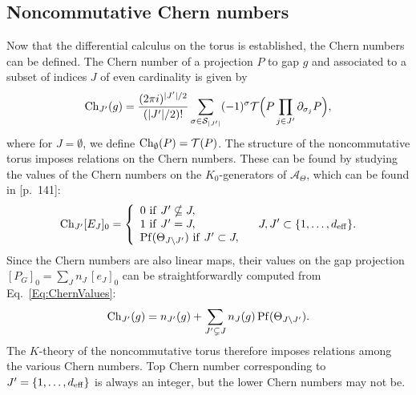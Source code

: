 \documentclass[
    aps,
    prb,
    twocolumn,
    floatfix,
    superscriptaddress,
	10pt
]{revtex4-2}
\begin{document}
\subsection{Noncommutative Chern numbers}

Now that the differential calculus on the torus is established, the Chern numbers can be defined.
The Chern number of a projection $P$ to gap $g$ and associated to a subset of indices $J$ of even cardinality is given by
\begin{equation}
	    {\rm Ch}_{J'}(g) = \frac{(2\pi i)^{|J'|/2}}{( |J'|/2 )!} \sum_{\sigma \in {\mathcal S}_{|J'|}} (-1)^\sigma {\mathcal T}\Big ( P \prod_{j \in J'} \partial_{\sigma_j}P \Big ) ,
\end{equation}
where for $J = \emptyset$, we define ${\rm Ch}_\emptyset(P) = {\mathcal T}(P)$.
The structure of the noncommutative torus imposes relations on the Chern numbers.
These can be found by studying the values of the Chern numbers on the $K_0$-generators of $\mathcal{A}_\Theta$, which can be found in \cite{Prodan2016}[p.~141]:
\begin{equation}\label{Eq:ChernValues}
{\rm Ch}_{J'} [E_J]_0 = \left \{ 
\begin{array}{l}
0 \ {\rm if} \ J'\nsubseteq J  , \\
1 \ {\rm if} \ J' = J , \\
{\rm Pf}(\Theta_{J\setminus J'}) \ {\rm if} \ J' \subset J,
\end{array}
\right .  \quad J, J' \subset \{1,\ldots,{d_\mathrm{eff}}\}.
\end{equation}
Since the Chern numbers are also linear maps, their values on the gap projection $[P_G]_0 = \sum_{J} n_J \, [e_J]_0$ can be straightforwardly computed from Eq.~\eqref{Eq:ChernValues}:
\begin{equation}\label{Eq:ChernVal}
{\rm Ch}_{J'}(g) = n_{J'}(g) + \sum_{J' \subsetneq J} n_J(g) \, {\rm Pf}(\Theta_{J\setminus J'}).
\end{equation} 
The $K$-theory of the noncommutative torus therefore imposes relations among the various Chern numbers. 
Top Chern number corresponding to $J'=\{1,\ldots,{d_\mathrm{eff}}\}$ is always an integer, but the lower Chern numbers may not be.
\end{document}
